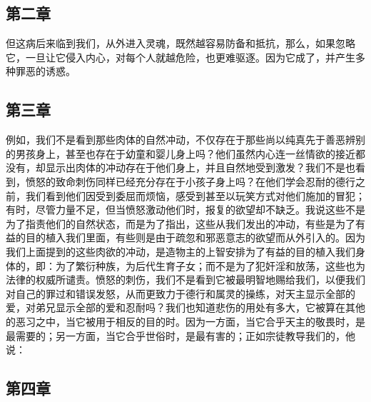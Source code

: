 
\subsection{第二章}

\par

但这病后来临到我们，从外进入灵魂，既然越容易防备和抵抗，那么，如果忽略它，一旦让它侵入内心，对每个人就越危险，也更难驱逐。因为它成了，并产生多种罪恶的诱惑。\par


\subsection{第三章}

\par

例如，我们不是看到那些肉体的自然冲动，不仅存在于那些尚以纯真先于善恶辨别的男孩身上，甚至也存在于幼童和婴儿身上吗？他们虽然内心连一丝情欲的接近都没有，却显示出肉体的冲动存在于他们身上，并且自然地受到激发？我们不是也看到，愤怒的致命刺伤同样已经充分存在于小孩子身上吗？在他们学会忍耐的德行之前，我们看到他们因受到委屈而烦恼，感受到甚至以玩笑方式对他们施加的冒犯；有时，尽管力量不足，但当愤怒激动他们时，报复的欲望却不缺乏。我说这些不是为了指责他们的自然状态，而是为了指出，这些从我们发出的冲动，有些是为了有益的目的植入我们里面，有些则是由于疏忽和邪恶意志的欲望而从外引入的。因为我们上面提到的这些肉欲的冲动，是造物主的上智安排为了有益的目的植入我们身体的，即：为了繁衍种族，为后代生育子女；而不是为了犯奸淫和放荡，这些也为法律的权威所谴责。愤怒的刺伤，我们不是看到它被最明智地赐给我们，以便我们对自己的罪过和错误发怒，从而更致力于德行和属灵的操练，对天主显示全部的爱，对弟兄显示全部的爱和忍耐吗？我们也知道悲伤的用处有多大，它被算在其他的恶习之中，当它被用于相反的目的时。因为一方面，当它合乎天主的敬畏时，是最需要的；另一方面，当它合乎世俗时，是最有害的；正如宗徒教导我们的，他说：\par


\subsection{第四章}

